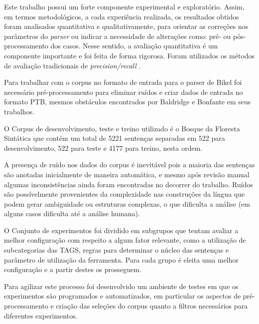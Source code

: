 Este trabalho possui um forte componente experimental e exploratório. Assim, em termos metodológicos, a cada experiência realizada, os resultados obtidos foram analisados quantitativa e qualitativamente, para orientar as correções nos parâmetros do \emph{parser} ou indicar a necessidade de alterações como: pré- ou pós-processamento dos casos. Nesse sentido, a avaliação quantitativa é um componente importante e foi feita de forma rigorosa. Foram utilizados os métodos de avaliação tradicionais de \emph{precision/recall} \cite{black91}.

Para trabalhar com o corpus no formato de entrada para o parser de Bikel foi necessário pré-processamento para eliminar ruídos e criar dados de entrada no formato PTB, mesmos obstáculos encontrados por Baldridge \cite{baldridge06} e Bonfante\cite{bonfante03} em seus trabalhos. 

O Corpus de desenvolvimento, teste e treino utilizado é o Bosque da Floresta Sintática que contém um total de 5221 sentenças separadas em 522 para desenvolvimento, 522 para teste e 4177 para treino, nesta ordem. 

A presença de ruído nos dados do corpus é inevitável pois a maioria das sentenças são anotadas inicialmente de maneira automática, e mesmo após revisão manual algumas inconsistências ainda foram encontradas no decorrer do trabalho. Ruídos são possívelmente provenientes da complexidade nas construções da língua que podem gerar ambiguidade ou estruturas complexas, o que dificulta a análise (em alguns casos dificulta até a análise humana). 

O Conjunto de experimentos foi dividido em subgrupos que tentam avaliar a melhor configuração com respeito a algum fator relevante, como a utilização de subcategorias das TAGS, regras para determinar o núcleo das sentenças e parâmetro de utilização da ferramenta. Para cada grupo é eleita uma melhor configuração e a partir destes os prosseguem.

Para agilizar este processo foi desenvolvido um ambiente de testes em que os experimentos são programados e automatizados, em particular os aspectos de pré-processamento e criação das seleções do corpus quanto a filtros necessários para diferentes experimentos.


